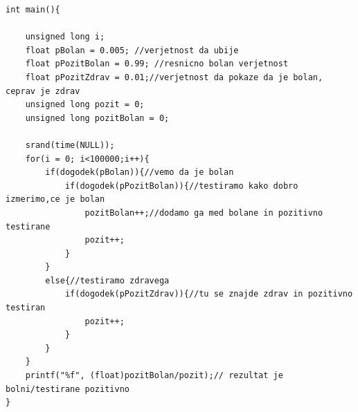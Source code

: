 \documentclass[a4paper, 12pt]{article}
\begin{document}
\begin{lstlisting}
int main(){

    unsigned long i;
	float pBolan = 0.005; //verjetnost da ubije
	float pPozitBolan = 0.99; //resnicno bolan verjetnost
	float pPozitZdrav = 0.01;//verjetnost da pokaze da je bolan, ceprav je zdrav
	unsigned long pozit = 0;
	unsigned long pozitBolan = 0;
	
	srand(time(NULL));
	for(i = 0; i<100000;i++){
		if(dogodek(pBolan)){//vemo da je bolan
			if(dogodek(pPozitBolan)){//testiramo kako dobro izmerimo,ce je bolan
				pozitBolan++;//dodamo ga med bolane in pozitivno testirane
				pozit++;
			}
		}
		else{//testiramo zdravega
			if(dogodek(pPozitZdrav)){//tu se znajde zdrav in pozitivno testiran
				pozit++;
			}
		}
	}
	printf("%f", (float)pozitBolan/pozit);// rezultat je bolni/testirane pozitivno
}
\end{lstlisting}
\end{document}
